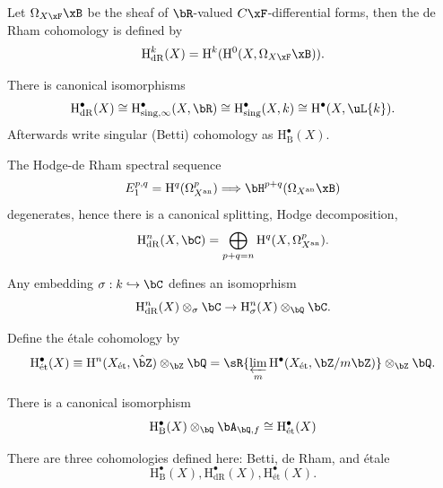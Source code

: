 \documentclass[a4paper, twoside]{article}
\begin{document}
\begin{dfn}[de Rham]
  Let $\Omega_{X\xF}\xB$ be the sheaf of $\bR$-valued $C\xF$-differential forms, then the de Rham cohomology is defined by
  \[
	\mathrm{H}_{\mathrm{dR}}^{k}(X)=\mathrm{H}_{~}^{k}(\mathrm{H}_{~}^{0}(X, \Omega_{X\xF}\xB)).
  \]
\end{dfn}

\begin{thm}[de Rham]
  There is canonical isomorphisms
  \[
	\mathrm{H}_{\mathrm{dR}}^{\bullet}(X)\cong \mathrm{H}_{\mathrm{sing},\infty}^{\bullet}(X, \bR)\cong\mathrm{H}_{\mathrm{sing}}^{\bullet}(X, k)\cong \mathrm{H}_{~}^{\bullet}(X, \uL{k}).
  \]
  Afterwards write singular (Betti) cohomology as $\mathrm{H}_{\mathrm{B}}^{\bullet}(X)$.
\end{thm}

\begin{thm}
  The Hodge-de Rham spectral sequence
  \[
	E_{1}^{p,q}= \mathrm{H}^{q}(\Omega_{X^{\mathrm{an}}}^{p})\Longrightarrow\bH^{p+q}(\Omega_{X^{\mathrm{an}}}\xB)
  \]
  degenerates, hence there is a canonical splitting, Hodge decomposition,
  \[
	\mathrm{H}_{\mathrm{dR}}^{n}(X, \bC)=\bigoplus_{p+q=n}\mathrm{H}_{~}^{q}(X, \Omega_{X^{\mathrm{an}}}^{p}).
  \]
\end{thm}

\begin{thm}
  Any embedding $\sigma:k\hookrightarrow \bC$ defines an isomoprhism
  \[
	\mathrm{H}_{\mathrm{dR}}^n(X)\otimes_\sigma\bC\rightarrow\mathrm{H}_\sigma^n(X)\otimes_\bQ\bC.
  \]
\end{thm}


\begin{dfn}[\'etale]
  Define the \'etale cohomology by
  \[
	\mathrm{H}_{\text{\'et}}^{\bullet}(X)\equiv \mathrm{H}_{~}^{n}(X_{\text{\'et}}, \hat{\bZ})\otimes_{\bZ}\bQ=\sR{\varprojlim_{m}\mathrm{H}_{~}^{\bullet}(X_{\text{\'et}}, \bZ/m\bZ)}\otimes_{\bZ}\bQ.
  \]
\end{dfn}

\begin{thm}[Comparison]
  There is a canonical isomorphism
  \[
	\mathrm{H}_{\mathrm{B}}^{\bullet}(X)\otimes_{\bQ}\bA_{\bQ,f}\cong \mathrm{H}_{\text{\'et}}^{\bullet}(X)
  \]
\end{thm}

\begin{rmk}
  There are three cohomologies defined here: Betti, de Rham, and \'etale
  \[
	\mathrm{H}_{\mathrm{B}}^{\bullet}(X), \mathrm{H}_{\mathrm{dR}}^{\bullet}(X), \mathrm{H}_{\text{\'et}}^{\bullet}(X).
  \]
\end{rmk}
\end{document}
